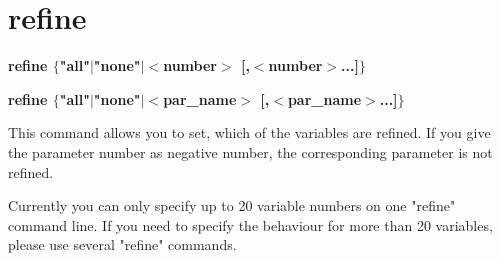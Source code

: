 \section{refine}
{\bf refine $ \{$"all"$| $"none"$| $$ <$number$> $ [,$ <$number$> $...]$\} $ \par }
{\bf refine $ \{$"all"$| $"none"$| $$ <$par\_name$> $ [,$ <$par\_name$> $...]$\} $ \par }
\par
\vspace{3pt}
This command allows you to set, which of the variables are refined. 
If you give the parameter number as negative number, the corresponding 
parameter is not refined. 
\par
Currently you can only specify up to 20 variable numbers on 
one "refine" command line. If you need to specify the behaviour 
for more than 20 variables, please use several "refine" commands. 

